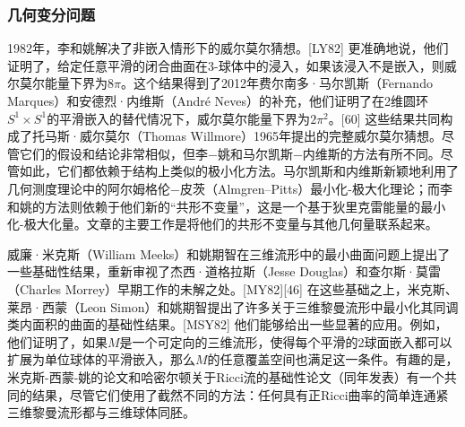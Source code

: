 \subsubsection{几何变分问题}  
1982年，李和姚解决了非嵌入情形下的威尔莫尔猜想。[LY82] 更准确地说，他们证明了，给定任意平滑的闭合曲面在3-球体中的浸入，如果该浸入不是嵌入，则威尔莫尔能量下界为\(8\pi\)。这个结果得到了2012年费尔南多·马尔凯斯（Fernando Marques）和安德烈·内维斯（André Neves）的补充，他们证明了在2维圆环\(S^1 \times S^1\)的平滑嵌入的替代情况下，威尔莫尔能量下界为\(2\pi^2\)。[60] 这些结果共同构成了托马斯·威尔莫尔（Thomas Willmore）1965年提出的完整威尔莫尔猜想。尽管它们的假设和结论非常相似，但李−姚和马尔凯斯−内维斯的方法有所不同。尽管如此，它们都依赖于结构上类似的极小化方法。马尔凯斯和内维斯新颖地利用了几何测度理论中的阿尔姆格伦−皮茨（Almgren–Pitts）最小化-极大化理论；而李和姚的方法则依赖于他们新的“共形不变量”，这是一个基于狄里克雷能量的最小化-极大化量。文章的主要工作是将他们的共形不变量与其他几何量联系起来。

威廉·米克斯（William Meeks）和姚期智在三维流形中的最小曲面问题上提出了一些基础性结果，重新审视了杰西·道格拉斯（Jesse Douglas）和查尔斯·莫雷（Charles Morrey）早期工作的未解之处。[MY82][46] 在这些基础之上，米克斯、莱昂·西蒙（Leon Simon）和姚期智提出了许多关于三维黎曼流形中最小化其同调类内面积的曲面的基础性结果。[MSY82] 他们能够给出一些显著的应用。例如，他们证明了，如果\(M\)是一个可定向的三维流形，使得每个平滑的2球面嵌入都可以扩展为单位球体的平滑嵌入，那么\(M\)的任意覆盖空间也满足这一条件。有趣的是，米克斯-西蒙-姚的论文和哈密尔顿关于Ricci流的基础性论文（同年发表）有一个共同的结果，尽管它们使用了截然不同的方法：任何具有正Ricci曲率的简单连通紧三维黎曼流形都与三维球体同胚。
